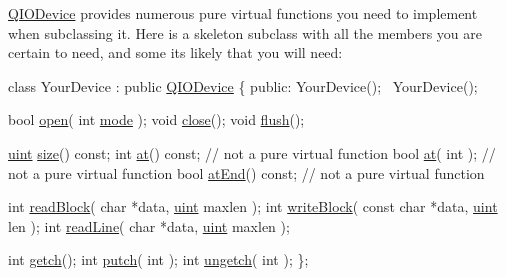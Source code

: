 \hyperlink{class_q_i_o_device}{Q\+I\+O\+Device} provides numerous pure virtual functions you need to implement when subclassing it. Here is a skeleton subclass with all the members you are certain to need, and some it\textquotesingle{}s likely that you will need\+:


\begin{DoxyCode}
\textcolor{keyword}{class }YourDevice : \textcolor{keyword}{public} \hyperlink{class_q_i_o_device}{QIODevice}
\{
\textcolor{keyword}{public}:
YourDevice();
   ~YourDevice();

\textcolor{keywordtype}{bool} \hyperlink{class_q_i_o_device_ae4046ae7bf4d4cee1010239973314e42}{open}( \textcolor{keywordtype}{int} \hyperlink{class_q_i_o_device_aed9e6cac66de3b004168bb408938f4e7}{mode} );
\textcolor{keywordtype}{void} \hyperlink{class_q_i_o_device_a01a9ddac5d964b5b6a1f10005bf28a4f}{close}();
\textcolor{keywordtype}{void} \hyperlink{class_q_i_o_device_a39eccb592ae076fbc42108a3d590fb43}{flush}();

\hyperlink{qglobal_8h_a4d3943ddea65db7163a58e6c7e8df95a}{uint} \hyperlink{class_q_i_o_device_ab94989478f8bd6742f6bfcd27926341e}{size}() \textcolor{keyword}{const};
\textcolor{keywordtype}{int}  \hyperlink{class_q_i_o_device_ae87e9d1d92b870e96ed04de97d7638f3}{at}() \textcolor{keyword}{const};  \textcolor{comment}{// not a pure virtual function}
\textcolor{keywordtype}{bool} \hyperlink{class_q_i_o_device_ae87e9d1d92b870e96ed04de97d7638f3}{at}( \textcolor{keywordtype}{int} );       \textcolor{comment}{// not a pure virtual function}
\textcolor{keywordtype}{bool} \hyperlink{class_q_i_o_device_a857ac5294bd88a1308e4c998af81f490}{atEnd}() \textcolor{keyword}{const};   \textcolor{comment}{// not a pure virtual function}

\textcolor{keywordtype}{int} \hyperlink{class_q_i_o_device_a71f10647e4bd98141f45362b9a06983a}{readBlock}( \textcolor{keywordtype}{char} *data, \hyperlink{qglobal_8h_a4d3943ddea65db7163a58e6c7e8df95a}{uint} maxlen );
\textcolor{keywordtype}{int} \hyperlink{class_q_i_o_device_a5d937df1bde2f956872dd54e077807d1}{writeBlock}( \textcolor{keyword}{const} \textcolor{keywordtype}{char} *data, \hyperlink{qglobal_8h_a4d3943ddea65db7163a58e6c7e8df95a}{uint} len );
\textcolor{keywordtype}{int} \hyperlink{class_q_i_o_device_a4dc865ffcb5b7896ff8f9a1d828e4c0e}{readLine}( \textcolor{keywordtype}{char} *data, \hyperlink{qglobal_8h_a4d3943ddea65db7163a58e6c7e8df95a}{uint} maxlen );

\textcolor{keywordtype}{int} \hyperlink{class_q_i_o_device_a7cef61d66023f9cda6b0912082bd19fc}{getch}();
\textcolor{keywordtype}{int} \hyperlink{class_q_i_o_device_a5de5c1c1cba7ca36ba93289e30cd3029}{putch}( \textcolor{keywordtype}{int} );
\textcolor{keywordtype}{int} \hyperlink{class_q_i_o_device_aae3d67422103e8fc0411297b1d62c29a}{ungetch}( \textcolor{keywordtype}{int} );
\};
\end{DoxyCode}


